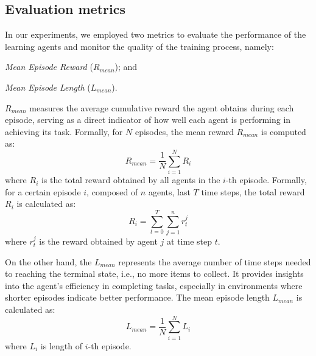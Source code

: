 \documentclass[sigconf]{acmart}
\begin{document}
\subsection{Evaluation metrics} 
In our experiments, we employed two metrics to evaluate the performance of the learning
  agents and monitor the quality of the training process, namely: 
  \begin{enumerate*}[label=(\roman*)]
    \item \emph{Mean Episode Reward} ($R_{mean}$); and
    \item \emph{Mean Episode Length} ($L_{mean}$).
  \end{enumerate*} 
%
$R_{mean}$ measures the average cumulative reward the agent obtains during each episode, 
  serving as a direct indicator of how well each agent is performing in achieving its task.
%
Formally, for $N$ episodes, the mean reward $R_{mean}$ is computed as:
  \[ R_{mean} = \frac{1}{N} \sum_{i=1}^{N} R_i \]
  where $R_i$ is the total reward obtained by all agents in the $i$-th episode. 
  Formally, for a certain episode $i$, composed of $n$ agents, last $T$ time steps, the total reward $R_i$ is calculated as:
  \[ R_i = \sum_{t=0}^{T} \sum_{j=1}^{n} r^j_t \]
  where $r^j_t$ is the reward obtained by agent $j$ at time step $t$.


On the other hand, the $L_{mean}$ represents the average number of time steps needed to reaching the terminal state, i.e., no more items to collect. 
%
It provides insights into the agent's efficiency in completing tasks, especially in environments 
  where shorter episodes indicate better performance.
%
The mean episode length $L_{mean}$ is calculated as:
  \[ L_{mean} = \frac{1}{N} \sum_{i=1}^{N} L_i \]
  where $L_i$ is length of $i$-th episode.


\end{document}
